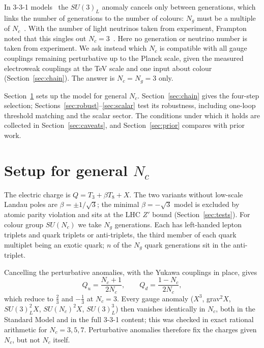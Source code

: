 \documentclass[11pt,a4paper]{article}
\newcommand{\Nc}{N_c}
\newcommand{\Ng}{N_g}
\begin{document}
In 3-3-1 models~\cite{Pisano:1992bxx,Frampton:1992wt} the $SU(3)_L$ anomaly cancels
only between generations, which links the number of generations to the number of
colours: $\Ng$ must be a multiple of $\Nc$~\cite{Pisano:1996ht,Doff:2000pc,Doff:2000tx}.
With the number of light neutrinos taken from experiment, Frampton noted that this
singles out $\Nc=3$~\cite{Frampton:1994rt}. Here no generation or neutrino number is
taken from experiment. We ask instead which $\Nc$ is compatible with all gauge couplings
remaining perturbative up to the Planck scale, given the measured electroweak couplings
at the TeV scale and one input about colour (Section~\ref{sec:chain}). The answer is
$\Nc=\Ng=3$ only.

Section~\ref{sec:setup} sets up the model for general $\Nc$. Section~\ref{sec:chain}
gives the four-step selection; Sections~\ref{sec:robust}--\ref{sec:scalar} test its
robustness, including one-loop threshold matching and the scalar sector. The
conditions under which it holds are collected in Section~\ref{sec:caveats}, and
Section~\ref{sec:prior} compares with prior work.

\section{Setup for general $N_c$}\label{sec:setup}

The electric charge is $Q=T_3+\beta T_8+X$. The two variants without low-scale Landau
poles are $\beta=\pm1/\sqrt3$; the minimal $\beta=-\sqrt3$ model is excluded by atomic
parity violation and sits at the LHC $Z'$ bound (Section~\ref{sec:tests}). For colour group $SU(\Nc)$ we take $\Ng$ generations.
Each has left-handed lepton triplets and quark triplets or anti-triplets, the third member
of each quark multiplet being an exotic quark; $n$ of the $\Ng$ quark generations sit in
the anti-triplet.

Cancelling the perturbative anomalies, with the Yukawa couplings in place, gives
\begin{equation}
  Q_u=\frac{\Nc+1}{2\Nc},\qquad Q_d=\frac{1-\Nc}{2\Nc},
\end{equation}
which reduce to $\tfrac23$ and $-\tfrac13$ at $\Nc=3$. Every gauge anomaly ($X^3$,
grav$^2X$, $SU(3)_L^2X$, $SU(\Nc)^2X$, $SU(3)_L^3$) then vanishes identically in $\Nc$,
both in the Standard Model and in the full 3-3-1 content; this was checked in exact
rational arithmetic for $\Nc=3,5,7$. Perturbative anomalies therefore fix the charges
given $\Nc$, but not $\Nc$ itself.
\end{document}
